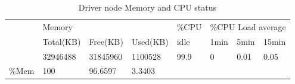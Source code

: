 \documentclass[12pt,a4paper]{report}
\begin{document}
\begin{table}[h]
\begin{tabular}{l|l|l|l|llll}
\cline{2-8}
\multirow{3}{*}{}           & \multicolumn{3}{l|}{Memory}     & \multicolumn{1}{l|}{\%CPU} & \multicolumn{3}{l|}{\%CPU Load average}                                            \\ \cline{2-8} 
                            & Total(KB) & Free(KB) & Used(KB) & \multicolumn{1}{l|}{idle}  & \multicolumn{1}{l|}{1min} & \multicolumn{1}{l|}{5min} & \multicolumn{1}{l|}{15min} \\ \cline{2-8} 
                            & 32946488  & 31845960 & 1100528   & \multicolumn{1}{l|}{99.9}  & \multicolumn{1}{l|}{0}    & \multicolumn{1}{l|}{0.01} & \multicolumn{1}{l|}{0.05}  \\ \hline
\multicolumn{1}{|l|}{\%Mem} & 100       & 96.6597  & 3.3403   &                            &                           &                           &                            \\ \cline{1-4}
\end{tabular}
\caption{Driver node Memory and CPU status}
\label{tab:driver-node}
\end{table}
\end{document}
